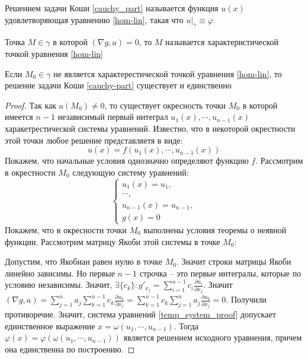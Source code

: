 \documentclass[document.tex]{subfiles}
\begin{document}
\begin{definition}
    Решением задачи Коши \ref{cauchy_part} называется функция $u(x)$ удовлетворяющая уравнению \ref{hom-lin}, такая что
    $u \Big|_{\gamma} \equiv \varphi$
\end{definition}

\begin{definition}
    Точка $M \in \gamma$ в которой $(\nabla g, a) = 0$, то $M$ называется характеристической точкой уравнения \ref{hom-lin}
\end{definition}

\begin{theorem}
    Если $M_0 \in \gamma$ не является характерестической точкой уравнения \ref{hom-lin}, то решение задачи Коши
    \ref{cauchy-part} существует и единственно
\end{theorem}

\begin{proof}
    Так как $a(M_0) \neq 0$, то существует окресность точки $M_0$ в которой имеется $n - 1$ независимый первый интеграл
    $u_1(x), \cdots, u_{n - 1}(x)$
    харакетрестической системы уравнений. Известно, что в некоторой окрестности этой точки любое решение представляетя в
    виде:
    \[
        u(x) = f(u_1(x), \cdots, u_{n - 1}(x))
    \] Покажем, что начальные условия однозначно определяют функцию $f$. Рассмотрим в окрестности $M_0$ следующую
    систему уравнений:
    \[
        \label{temp_system_proof}
        \begin{cases}
            u_1(x) = u_1, \\
            \cdots, \\
            u_{n - 1}(x) = u_{n - 1}, \\
            g(x) = 0
        \end{cases}
    \] Покажем, что в окресности точки $M_0$ выполнены условия теоремы о неявной функции. Рассмотрим матрицу Якоби этой
    системы в точке $M_0$:

    Допустим, что Якобиан равен нулю в точке $M_0$. Значит строки матрицы Якоби линейно зависимы. Но первые $n - 1$
    строчка -- это первые интегралы, которые по условию независимы. Значит, $\exists \{c_k\}: g'_{x_j} = \sum_{i = 1}^{n
    - 1} c_i \frac{\partial u_i}{\partial x_j}$. Значит $(\nabla g, a) = \sum_{j = 1}^n a_j \sum_{k = 1}^{n - 1} c_k
    \frac{\partial u_k}{\partial x_j} = \sum_{k = 1}^{n - 1} c_k \sum_{j = 1}^n a_j \frac{\partial u_k}{\partial x_j} =
    0$. Получили противоречие. Значит, система уравнений \ref{temp_system_proof} допускает единственное выражение $x =
    \omega(u_1, \cdots, u_{n - 1})$. Тогда $\varphi(x) = \varphi(\omega(u_1, \cdots, u_{n - 1}))$ является решением
    исходного уравнения, причем она единственна по построению.
\end{proof}
\end{document}
